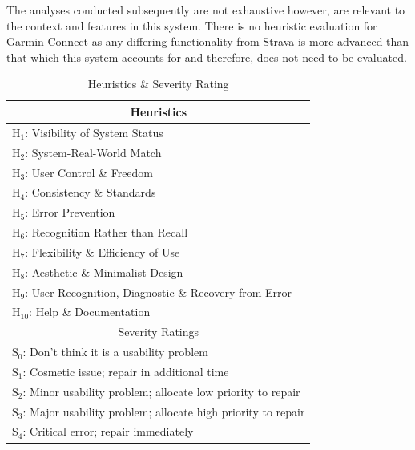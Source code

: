 \documentclass[11pt, english]{article}
\begin{document}
	The analyses conducted subsequently are not exhaustive however, are relevant to the context and features in this system. There is no heuristic evaluation for Garmin Connect as any differing functionality from Strava is more advanced than that which this system accounts for and therefore, does not need to be evaluated.

	\begin{table}[h]
                \scriptsize
                \renewcommand{\arraystretch}{1.25}
        \begin{center}
        \begin{tabular}{c}
                \hline
                Heuristics\\
                \hline
                \multicolumn{1}{l}{$\mathrm{H_{1}}$: Visibility of System Status}\\
                \multicolumn{1}{l}{$\mathrm{H_{2}}$: System-Real-World Match}\\
                \multicolumn{1}{l}{$\mathrm{H_{3}}$: User Control \& Freedom}\\
                \multicolumn{1}{l}{$\mathrm{H_{4}}$: Consistency \& Standards}\\
                \multicolumn{1}{l}{$\mathrm{H_{5}}$: Error Prevention}\\
                \multicolumn{1}{l}{$\mathrm{H_{6}}$: Recognition Rather than Recall}\\
                \multicolumn{1}{l}{$\mathrm{H_{7}}$: Flexibility \& Efficiency of Use}\\
                \multicolumn{1}{l}{$\mathrm{H_{8}}$: Aesthetic \& Minimalist Design}\\
                \multicolumn{1}{l}{$\mathrm{H_{9}}$: User Recognition, Diagnostic \& Recovery from Error}\\
                \multicolumn{1}{l}{$\mathrm{H_{10}}$: Help \& Documentation}\\
                \hline
                Severity Ratings\\
                \hline
                \multicolumn{1}{l}{$\mathrm{S_{0}}$: Don't think it is a usability problem}\\
                \multicolumn{1}{l}{$\mathrm{S_{1}}$: Cosmetic issue; repair in additional time}\\
                \multicolumn{1}{l}{$\mathrm{S_{2}}$: Minor usability problem; allocate low priority to repair}\\
                \multicolumn{1}{l}{$\mathrm{S_{3}}$: Major usability problem; allocate high priority to repair}\\
                \multicolumn{1}{l}{$\mathrm{S_{4}}$: Critical error; repair immediately}\\
                \hline
        \end{tabular}
                \caption{Heuristics \& Severity Rating}
        \end{center}
        \end{table}
\end{document}
